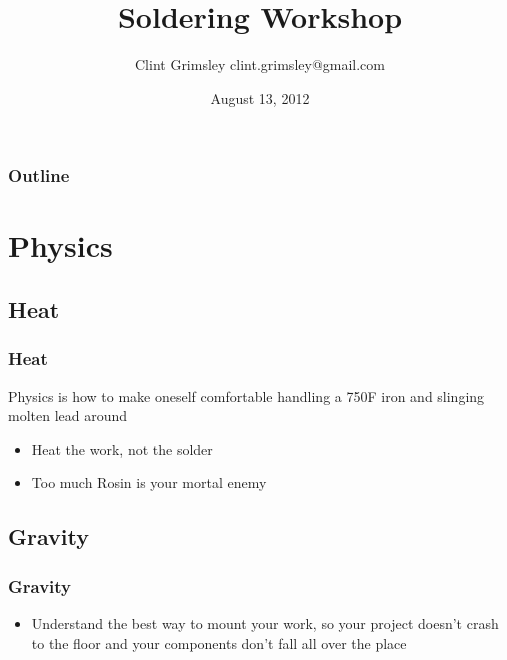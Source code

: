 \documentclass{beamer}
\title{Soldering Workshop}
\author{Clint Grimsley clint.grimsley@gmail.com}
\institute{HackRVA}
\date{August 13, 2012}
\begin{document}
\begin{frame}
\titlepage
\end{frame}

\begin{frame}
  \frametitle{Outline}
    \tableofcontents
\end{frame}

\section{Physics}
\subsection{Heat}
\begin{frame}
  \frametitle{Heat}
  Physics is how to make oneself comfortable handling a 750\textdegree F  iron and slinging molten lead around
  \begin{itemize}
    \item Heat the work, not the solder
    \item Too much Rosin is your mortal enemy
  \end{itemize}
\end{frame}

\subsection{Gravity}
\begin{frame}
  \frametitle{Gravity}
  \begin{itemize}
    \item Understand the best way to mount your work, so your project
      doesn't crash to the floor and your components don't fall all
      over the place
  \end{itemize}
\end{frame}
\end{document}
